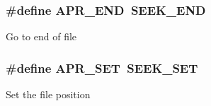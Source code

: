 \subsubsection[{\texorpdfstring{A\+P\+R\+\_\+\+E\+ND}{APR_END}}]{\setlength{\rightskip}{0pt plus 5cm}\#define A\+P\+R\+\_\+\+E\+ND~S\+E\+E\+K\+\_\+\+E\+ND}\hypertarget{group__apr__file__seek__flags_ga438f3568be799d1e4bbd19492ca47d22}{}\label{group__apr__file__seek__flags_ga438f3568be799d1e4bbd19492ca47d22}
Go to end of file 
\subsubsection[{\texorpdfstring{A\+P\+R\+\_\+\+S\+ET}{APR_SET}}]{\setlength{\rightskip}{0pt plus 5cm}\#define A\+P\+R\+\_\+\+S\+ET~S\+E\+E\+K\+\_\+\+S\+ET}\hypertarget{group__apr__file__seek__flags_ga2fdf78845c897f69451d49e1e2b90ac9}{}\label{group__apr__file__seek__flags_ga2fdf78845c897f69451d49e1e2b90ac9}
Set the file position 